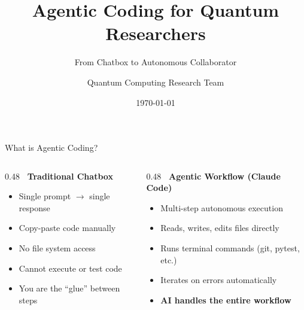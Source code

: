 \documentclass[aspectratio=169]{beamer}
\title{\textbf{Agentic Coding for Quantum Researchers}}
\subtitle{From Chatbox to Autonomous Collaborator}
\author{Quantum Computing Research Team}
\date{\today}
\begin{document}
\begin{frame}
\titlepage
\end{frame}

\begin{frame}{What is Agentic Coding?}

\begin{columns}[T]
\begin{column}{0.48\textwidth}
\textbf{\textcolor{claudeOrange}{\faRobot\ Traditional Chatbox}}
\begin{itemize}
    \item Single prompt $\rightarrow$ single response
    \item Copy-paste code manually
    \item No file system access
    \item Cannot execute or test code
    \item You are the ``glue'' between steps
\end{itemize}
\end{column}

\begin{column}{0.48\textwidth}
\textbf{\textcolor{quantumBlue}{\faCogs\ Agentic Workflow (Claude Code)}}
\begin{itemize}
    \item Multi-step autonomous execution
    \item Reads, writes, edits files directly
    \item Runs terminal commands (git, pytest, etc.)
    \item Iterates on errors automatically
    \item \textbf{AI handles the entire workflow}
\end{itemize}
\end{column}
\end{columns}

\vspace{0.5cm}
\begin{center}
\end{center}

\end{frame}
\end{document}
